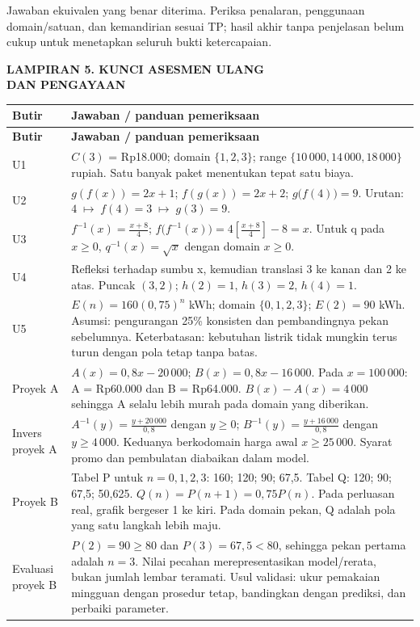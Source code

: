 \documentclass[11pt,a4paper]{article}
\begin{document}
{\small Jawaban ekuivalen yang benar diterima. Periksa penalaran, penggunaan domain/satuan, dan kemandirian sesuai TP; hasil akhir tanpa penjelasan belum cukup untuk menetapkan seluruh bukti ketercapaian.\par}\medskip
\clearpage
\begin{center}\bfseries\large LAMPIRAN 5. KUNCI ASESMEN ULANG\\[2pt] DAN PENGAYAAN\end{center}\medskip
{\small\setlength{\tabcolsep}{2mm}\renewcommand{\arraystretch}{1.35}\begin{longtable}{|>{\raggedright\arraybackslash}p{27.795mm}|>{\raggedright\arraybackslash}p{141.755mm}|}\hline
\rowcolor{gray!10}\textbf{Butir} & \textbf{Jawaban / panduan pemeriksaan}\\ \hline
\endfirsthead
\rowcolor{gray!10}\textbf{Butir} & \textbf{Jawaban / panduan pemeriksaan}\\ \hline
\endhead
U1 & \(C(3)\) = Rp18.000; domain \(\{1, 2, 3\}\); range \(\{10\,000, 14\,000, 18\,000\}\) rupiah. Satu banyak paket menentukan tepat satu biaya.\\ \hline
U2 & \(g(f(x)) = 2x + 1\); \(f(g(x)) = 2x + 2\); \(g\bigl(f(4)\bigr)=9\). Urutan: \(4\;\longmapsto\;f(4)=3\;\longmapsto\;g(3)=9\).\\ \hline
U3 & \(f^{-1}(x)=\frac{x+8}{4}\); \(f\bigl(f^{-1}(x)\bigr)=4\left[\frac{x+8}{4}\right]-8=x\). Untuk q pada \(x \geq  0\), \(q^{-1}(x)=\sqrt{x}\) dengan domain \(x \geq  0\).\\ \hline
U4 & Refleksi terhadap sumbu x, kemudian translasi 3 ke kanan dan 2 ke atas. Puncak \((3, 2)\); \(h(2) = 1\), \(h(3) = 2\), \(h(4) = 1\).\\ \hline
U5 & \(E(n)=160(0{,}75)^n\) kWh; domain \(\{0, 1, 2, 3\}\); \(E(2) = 90\) kWh. Asumsi: pengurangan 25\% konsisten dan pembandingnya pekan sebelumnya. Keterbatasan: kebutuhan listrik tidak mungkin terus turun dengan pola tetap tanpa batas.\\ \hline
Proyek A & \(A(x) = 0{,}8x - 20\,000\); \(B(x) = 0{,}8x - 16\,000\). Pada \(x = 100\,000\): A = Rp60.000 dan B = Rp64.000. \(B(x)-A(x)=4\,000\) sehingga A selalu lebih murah pada domain yang diberikan.\\ \hline
Invers proyek A & \(A^{-1}(y)=\frac{y+20\,000}{0{,}8}\) dengan \(y \geq  0\); \(B^{-1}(y)=\frac{y+16\,000}{0{,}8}\) dengan \(y \geq  4\,000\). Keduanya berkodomain harga awal \(x \geq  25\,000\). Syarat promo dan pembulatan diabaikan dalam model.\\ \hline
Proyek B & Tabel P untuk \(n = 0, 1, 2, 3\): 160; 120; 90; 67,5. Tabel Q: 120; 90; 67,5; 50,625. \(Q(n)=P(n+1)=0{,}75P(n)\). Pada perluasan real, grafik bergeser 1 ke kiri. Pada domain pekan, Q adalah pola yang satu langkah lebih maju.\\ \hline
Evaluasi proyek B & \(P(2)=90\geq80\) dan \(P(3)=67{,}5<80\), sehingga pekan pertama adalah \(n = 3\). Nilai pecahan merepresentasikan model/rerata, bukan jumlah lembar teramati. Usul validasi: ukur pemakaian mingguan dengan prosedur tetap, bandingkan dengan prediksi, dan perbaiki parameter.\\ \hline
\end{longtable}}\medskip
\end{document}
